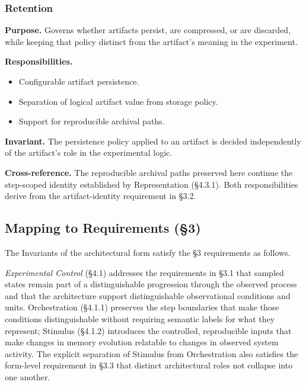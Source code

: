   \subsubsection{Retention}\label{subsubsec:retention}
  \textbf{Purpose.} Governs whether artifacts persist, are compressed, or are discarded, while keeping that policy distinct from the artifact's meaning in the experiment.

  \textbf{Responsibilities.}
  \begin{itemize}
    \item Configurable artifact persistence.
    \item Separation of logical artifact value from storage policy.
    \item Support for reproducible archival paths.
  \end{itemize}

  \textbf{Invariant.} The persistence policy applied to an artifact is decided independently of the artifact's role in the experimental logic.

  \textbf{Cross-reference.} The reproducible archival paths preserved here continue the step-scoped identity established by Representation (\S4.3.1). Both responsibilities derive from the artifact-identity requirement in \S3.2.



\subsection*{Mapping to Requirements (\S3)}\label{subsec:mapping}

The Invariants of the architectural form satisfy the \S3 requirements as follows.

\emph{Experimental Control} (\S4.1) addresses the requirements in \S3.1 that sampled states remain part of a distinguishable progression through the observed process and that the architecture support distinguishable observational conditions and units. Orchestration (\S4.1.1) preserves the step boundaries that make those conditions distinguishable without requiring semantic labels for what they represent; Stimulus (\S4.1.2) introduces the controlled, reproducible inputs that make changes in memory evolution relatable to changes in observed system activity. The explicit separation of Stimulus from Orchestration also satisfies the form-level requirement in \S3.3 that distinct architectural roles not collapse into one another.

